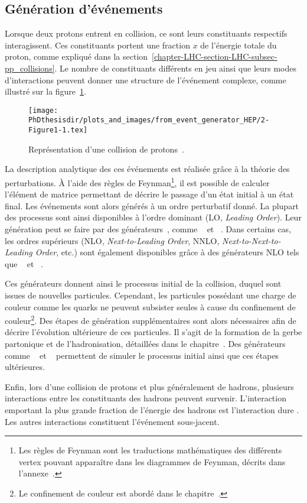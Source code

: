 \subsection{Génération d'événements}\label{chapter-LHC-section-MC-subsec-evt_gen}
Lorsque deux protons entrent en collision, ce sont leurs constituants respectifs interagissent.
Ces constituants portent une fraction $x$ de l'énergie totale du proton, comme expliqué dans la section~\ref{chapter-LHC-section-LHC-subsec-pp_collisions}.
Le nombre de constituants différents en jeu ainsi que leurs modes d'interactions peuvent donner une structure de l'événement complexe, comme illustré sur la figure~\ref{fig-event_generator_HEP-2-Figure1-1}.
\begin{figure}[h]
\centering
\texttt{[image: \\PhDthesisdir/plots\_and\_images/from\_event\_generator\_HEP/2-Figure1-1.tex]}
\caption[Représentation d'une collision de protons.]{Représentation d'une collision de protons~\cite{event_generator_HEP}.}
\label{fig-event_generator_HEP-2-Figure1-1}
\end{figure}
\par La description analytique des ces événements est réalisée grâce à la théorie des perturbations.
À l'aide des règles de Feynman\footnote{Les règles de Feynman sont les traductions mathématiques des différents vertex pouvant apparaître dans les diagrammes de Feynman, décrits dans l'annexe~.}, il est possible de calculer l'\og élément de matrice \fg{} permettant de décrire le passage d'un état initial à un état final.
Les événements sont alors générés à un ordre perturbatif donné.
La plupart des processus sont ainsi disponibles à l'ordre dominant (LO, \emph{Leading Order}).
Leur génération peut se faire par des générateurs~\cite{CAVENDISH-HEP-10-21}, comme
\MADGRAPH~\cite{madgraph5} et
\PYTHIA~\cite{pythia6.4,pythia8.2}.
Dans certains cas, les ordres supérieurs (NLO, \emph{Next-to-Leading Order}, NNLO, \emph{Next-to-Next-to-Leading Order}, etc.) sont également disponibles grâce à des générateurs NLO tels que
\POWHEG~\cite{Alioli:2010xd} et
\MCATNLO~\cite{MCATNLO}.
\par Ces générateurs donnent ainsi le processus initial de la collision, duquel sont issues de nouvelles particules.
Cependant, les particules possédant une charge de couleur comme les quarks ne peuvent subsister seules à cause du confinement de couleur\footnote{Le confinement de couleur est abordé dans le chapitre~.}.
Des étapes de génération supplémentaires sont alors nécessaires afin de décrire l'évolution ultérieure de ces particules.
Il s'agit de la formation de la gerbe partonique et de l'hadronisation, détaillées dans le chapitre~.
Des générateurs comme
\PYTHIA~\cite{pythia6.4,pythia8.2} et
\HERWIG~\cite{herwig}
permettent de simuler le processus initial ainsi que ces étapes ultérieures.
\par Enfin, lors d'une collision de protons et plus généralement de hadrons, plusieurs interactions entre les constituants des hadrons peuvent survenir.
L'interaction emportant la plus grande fraction de l'énergie des hadrons est l'\og interaction dure \fg{}.
Les autres interactions constituent l'événement sous-jacent.
